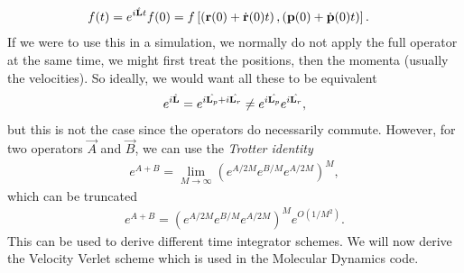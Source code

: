 \begin{align}
	f(t) &= e^{i\hat{\mathbf L} t}f(0) = f\left[\left(\mathbf r(0) + \dot{\mathbf r}(0)t\right), \left(\mathbf p(0) + \dot{\mathbf p}(0)t\right)\right].
\end{align}
If we were to use this in a simulation, we normally do not apply the full operator at the same time, we might first treat the positions, then the momenta (usually the velocities). So ideally, we would want all these to be equivalent
\begin{align}
	e^{i\hat{\mathbf L}} = e^{i\hat{\mathbf L_p} + i\hat{\mathbf L_r}} \neq e^{i\hat{\mathbf L_p}}e^{i\hat{\mathbf L_r}},
\end{align}
but this is not the case since the operators do necessarily commute. However, for two operators $\vec A$ and $\vec B$, we can use the \textit{Trotter identity}\cite{frenkel2001understanding}
\begin{align}
	e^{A + B} = \lim_{M\rightarrow\infty}\left(e^{A/2M}e^{B/M}e^{A/2M}\right)^M,
\end{align}
which can be truncated
\begin{align}
	e^{A + B} = \left(e^{A/2M}e^{B/M}e^{A/2M}\right)^Me^{O(1/M^2)}.
\end{align}
This can be used to derive different time integrator schemes. We will now derive the Velocity Verlet scheme which is used in the Molecular Dynamics code.
